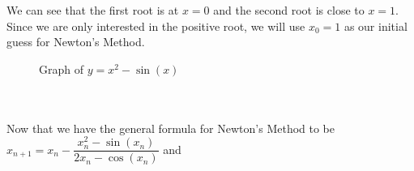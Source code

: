 \documentclass[12pt]{book}
\begin{document}
\begin{enumerate}
\begin{minipage}{0.5\textwidth}
    We can see that the first root is at $x=0$ and the second root is close to $x=1$. Since we are only interested in the positive root, we will use $x_0=1$ as our initial guess for Newton's Method.
\end{minipage}
\begin{minipage}{0.5\textwidth}
    \begin{figure}[H] %
    \caption{Graph of $y=x^2-\sin(x)$}
    \end{figure}
\end{minipage}\\\\

Now that we have the general formula for Newton's Method to be $x_{n+1} = x_n - \dfrac{x_n^2-\sin(x_n)}{2x_n - \cos(x_n)}$ and\\


\end{enumerate}
\end{document}
